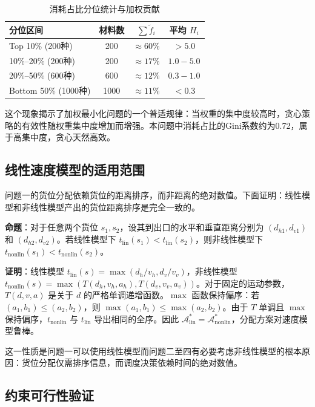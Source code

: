 \documentclass[a4paper]{cumcmthesis}
\newcommand{\headcol}{\rowcolor{tableheadcolor}}
\newcommand{\ftilde}{\tilde{f}}
\begin{document}
\begin{table}[htbp]
\centering\small
\caption{消耗占比分位统计与加权贡献}
\label{tab:pareto}
\begin{tabular}{lccc}
\toprule
\headcol 分位区间 & 材料数 & $\sum\ftilde_i$ & 平均 $H_i$ \\
\midrule
Top 10\% (200种) & 200 & $\approx 60\%$ & $>5.0$ \\
10\%--20\% (200种) & 200 & $\approx 17\%$ & $1.0-5.0$ \\
20\%--50\% (600种) & 600 & $\approx 12\%$ & $0.3-1.0$ \\
Bottom 50\% (1000种) & 1000 & $\approx 11\%$ & $<0.3$ \\
\bottomrule
\end{tabular}
\end{table}

这个现象揭示了加权最小化问题的一个普适规律：当权重的集中度较高时，贪心策略的有效性随权重集中度增加而增强。本问题中消耗占比的Gini系数约为0.72，属于高集中度，贪心天然高效。

\subsection{线性速度模型的适用范围}

问题一的货位分配依赖货位的距离排序，而非距离的绝对数值。下面证明：线性模型和非线性模型产出的货位距离排序是完全一致的。

\textbf{命题}：对于任意两个货位 $s_1, s_2$，设其到出口的水平和垂直距离分别为 $(d_{h1}, d_{v1})$ 和 $(d_{h2}, d_{v2})$。若线性模型下 $t_{\text{lin}}(s_1) < t_{\text{lin}}(s_2)$，则非线性模型下 $t_{\text{nonlin}}(s_1) < t_{\text{nonlin}}(s_2)$。

\textbf{证明}：线性模型 $t_{\text{lin}}(s)=\max(d_h/v_h, d_v/v_v)$，非线性模型 $t_{\text{nonlin}}(s)=\max(T(d_h,v_h,a_h), T(d_v,v_v,a_v))$。对于固定的运动参数，$T(d,v,a)$ 是关于 $d$ 的严格单调递增函数。$\max$ 函数保持偏序：若 $(a_1,b_1)\leq(a_2,b_2)$，则 $\max(a_1,b_1)\leq\max(a_2,b_2)$。由于 $T$ 单调且 $\max$ 保持偏序，$t_{\text{nonlin}}$ 与 $t_{\text{lin}}$ 导出相同的全序。因此 $\mathcal{A}_{\text{lin}}^* = \mathcal{A}_{\text{nonlin}}^*$，分配方案对速度模型鲁棒。

这一性质是问题一可以使用线性模型而问题二至四有必要考虑非线性模型的根本原因：货位分配仅需排序信息，而调度决策依赖时间的绝对数值。

\subsection{约束可行性验证}
\end{document}
